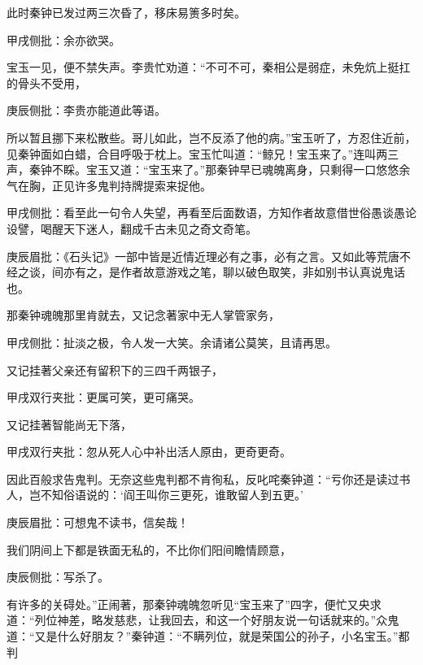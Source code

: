 \begin{parag}


    此时秦钟已发过两三次昏了，移床易箦多时矣。\begin{note}甲戌侧批：余亦欲哭。\end{note}宝玉一见，便不禁失声。李贵忙劝道：“不可不可，秦相公是弱症，未免炕上挺扛的骨头不受用，\begin{note}庚辰侧批：李贵亦能道此等语。\end{note}所以暂且挪下来松散些。哥儿如此，岂不反添了他的病。”宝玉听了，方忍住近前，见秦钟面如白蜡，合目呼吸于枕上。宝玉忙叫道：“鲸兄！宝玉来了。”连叫两三声，秦钟不睬。宝玉又道：“宝玉来了。”那秦钟早已魂魄离身，只剩得一口悠悠余气在胸，正见许多鬼判持牌提索来捉他。\begin{note}甲戌侧批：看至此一句令人失望，再看至后面数语，方知作者故意借世俗愚谈愚论设譬，喝醒天下迷人，翻成千古未见之奇文奇笔。\end{note}\begin{note}庚辰眉批：《石头记》一部中皆是近情近理必有之事，必有之言。又如此等荒唐不经之谈，间亦有之，是作者故意游戏之笔，聊以破色取笑，非如别书认真说鬼话也。\end{note}那秦钟魂魄那里肯就去，又记念著家中无人掌管家务，\begin{note}甲戌侧批：扯淡之极，令人发一大笑。余请诸公莫笑，且请再思。\end{note}又记挂著父亲还有留积下的三四千两银子，\begin{note}甲戌双行夹批：更属可笑，更可痛哭。\end{note}又记挂著智能尚无下落，\begin{note}甲戌双行夹批：忽从死人心中补出活人原由，更奇更奇。\end{note}因此百般求告鬼判。无奈这些鬼判都不肯徇私，反叱咤秦钟道：“亏你还是读过书人，岂不知俗语说的：‘阎王叫你三更死，谁敢留人到五更。’\begin{note}庚辰眉批：可想鬼不读书，信矣哉！\end{note}我们阴间上下都是铁面无私的，不比你们阳间瞻情顾意，\begin{note}庚辰侧批：写杀了。\end{note}有许多的关碍处。”正闹著，那秦钟魂魄忽听见“宝玉来了”四字，便忙又央求道：“列位神差，略发慈悲，让我回去，和这一个好朋友说一句话就来的。”众鬼道：“又是什么好朋友？”秦钟道：“不瞒列位，就是荣国公的孙子，小名宝玉。”都判
\end{parag}
